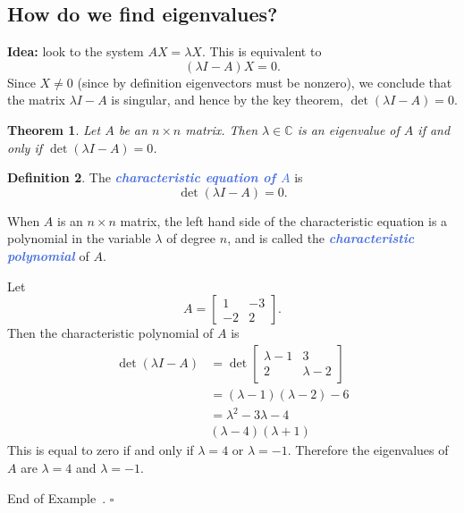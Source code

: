 \documentclass[10pt]{article}
\newcommand{\demph}[1]{\textcolor{RoyalBlue}{\textbf{\slshape #1}}} %
\newtheorem{theorem}{Theorem}
\theoremstyle{definition}
\newtheorem{definition}[theorem]{Definition}
\newtheorem{example}[theorem]{Example}
\renewenvironment{example}
{\begin{oldexample}}
  {\par\smallskip\hfill   End of Example~\theexample. $\square$    \par\end{oldexample}}
\newcommand{\C}{\mathbb{C}}           %
\begin{document}
\subsection{How do we find eigenvalues?}

\textbf{Idea:} look to the system
$AX =\lambda X$.
This is equivalent to 
\begin{equation*}
  (\lambda I-A)X=0.
\end{equation*}
Since $X\neq 0$ (since by definition eigenvectors must be nonzero), we
conclude that the matrix $\lambda I - A$ is singular, and hence by the key
theorem, $\det(\lambda I -A)=0$. 

\begin{theorem}
  Let $A$ be an $n\times n$ matrix. Then $\lambda\in \C$ is an eigenvalue of
  $A$ if and only if $\det(\lambda I-A)=0$.
\end{theorem}


\begin{definition}
  The \demph{characteristic equation of $A$ } is
  \begin{equation*}
    \det(\lambda I-A)=0.
  \end{equation*}
\end{definition}
When $A$ is an $n\times n$ matrix, the left hand side of the characteristic
equation is a polynomial in the variable $\lambda$ of degree $n$, and is
called the \demph{characteristic polynomial} of $A$.


\begin{example}
  Let
  \begin{equation*}
    A =
    \begin{bmatrix}
      1&-3\\-2&2
    \end{bmatrix}.
  \end{equation*}
  Then the characteristic polynomial of $A$ is
  \begin{align*}
    \det(\lambda I-A) 
    &= \det
      \begin{bmatrix}
        \lambda-1& 3\\
        2& \lambda-2
      \end{bmatrix} \\
    &=(\lambda-1)(\lambda-2)-6\\
    &=\lambda^{2}-3\lambda-4\\
    &(\lambda-4)(\lambda+1)
  \end{align*}
  This is equal to zero if and only if $\lambda=4$ or $\lambda=-1$. Therefore
  the eigenvalues of $A$ are $\lambda=4$ and $\lambda=-1.$ 
\end{example}
\end{document}
